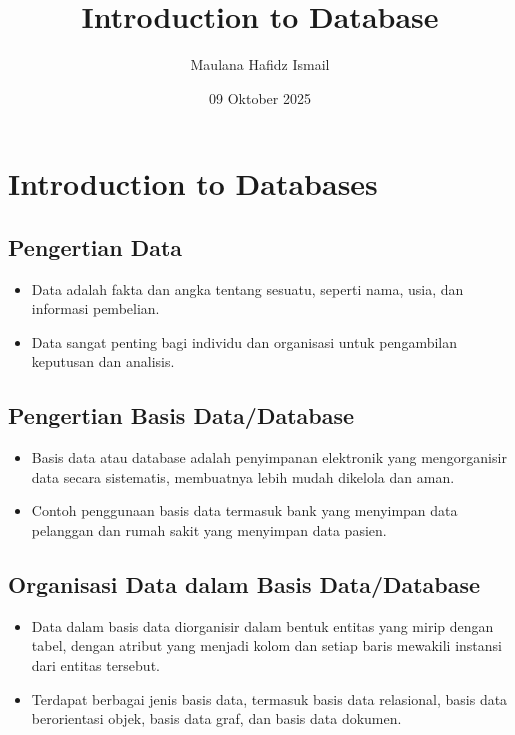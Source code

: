 \documentclass{article}
\title{Introduction to Database}
\date{09 Oktober 2025}
\author{Maulana Hafidz Ismail}
\begin{document}
\maketitle
\newpage

\tableofcontents
\newpage
{}

\section{Introduction to Databases}
\subsection{Pengertian Data}
\begin{itemize}
    \item Data adalah fakta dan angka tentang sesuatu, seperti nama, usia, dan informasi pembelian.
    \item Data sangat penting bagi individu dan organisasi untuk pengambilan keputusan dan analisis.
\end{itemize}

\subsection{Pengertian Basis Data/Database}
\begin{itemize}
    \item Basis data atau database adalah penyimpanan elektronik yang mengorganisir data secara sistematis, membuatnya lebih mudah dikelola dan aman.
    \item Contoh penggunaan basis data termasuk bank yang menyimpan data pelanggan dan rumah sakit yang menyimpan data pasien.
\end{itemize}

\subsection{Organisasi Data dalam Basis Data/Database}
\begin{itemize}
    \item Data dalam basis data diorganisir dalam bentuk entitas yang mirip dengan tabel, dengan atribut yang menjadi kolom dan setiap baris mewakili instansi dari entitas tersebut.
    \item Terdapat berbagai jenis basis data, termasuk basis data relasional, basis data berorientasi objek, basis data graf, dan basis data dokumen.
\end{itemize}
\end{document}
